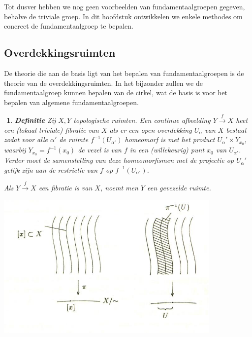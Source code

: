\documentclass[12pt]{book}
\newtheorem{dfh}[stelh]{$\!\!$}
\newenvironment{df}{\begin{dfh} \em {\bf Definitie }}{\end{dfh}}
\begin{document}
Tot dusver hebben we nog geen voorbeelden van fundamentaalgroepen gegeven, behalve de triviale groep. In dit hoofdstuk ontwikkelen we enkele methodes om concreet de fundamentaalgroep te bepalen.




\subsection{Overdekkingsruimten}\label{section:overdekking}

De theorie die aan de basis ligt van het bepalen van fundamentaalgroepen is de theorie van de overdekkingsruimten. In het bijzonder zullen we de fundamentaalgroep kunnen bepalen van de cirkel, wat de basis is voor het bepalen van algemene fundamentaalgroepen.


\begin{df} Zij $X, Y$ topologische ruimten. Een continue afbeelding 
$Y\stackrel{f}{\to} X$ heet een (lokaal triviale)  {\em fibratie} van $X$ als er een open overdekking $U_{\alpha}$ van $X$ bestaat zodat voor alle $\alpha'$ de ruimte $f^{-1}(U_{\alpha'})$ homeomorf
is met het product $U_\alpha' \times Y_{x_{0}}$, waarbij $Y_{x_{0}}=f^{-1}(x_{0})$ de vezel is van $f$ in een (willekeurig) punt $x_0$ van $U_{\alpha'}$. Verder moet de samenstelling van deze homeomorfismen met de projectie op $U_\alpha'$ gelijk zijn aan de restrictie van $f$ op $f^{-1}(U_{\alpha'})$.

Als $Y\stackrel{f}{\to} X$ een fibratie is van $X$, noemt men $Y$ een {\em gevezelde ruimte}.
\end{df}

\begin{center}
\includegraphics[width=11cm]{images/qrvoor.JPG}
\end{center}
\end{document}
